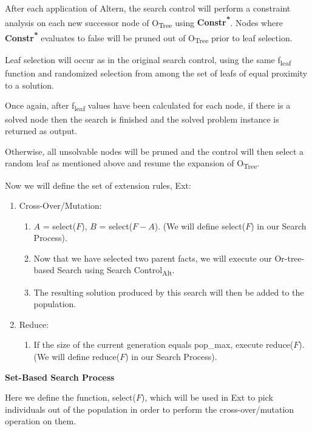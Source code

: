 \documentclass[11pt, oneside]{article}   	%
\newenvironment{cmr}{\fontfamily{cmr}\selectfont}{\par}
\begin{document}
\noindent After each application of Altern, the search control will perform a constraint analysis on each new successor node of O\textsubscript{Tree} using \textbf{Constr\textsuperscript{*}}.
Nodes where \textbf{Constr\textsuperscript{*}} evaluates to false will be pruned out of O\textsubscript{Tree} prior to leaf selection.

\noindent Leaf selection will occur as in the original search control, using the same f\textsubscript{leaf} function and randomized selection from among the set of leafs of equal proximity to a solution.

\begin{cmr}
\noindent Once again, after f\textsubscript{leaf} values have been calculated for each node, if there is a solved node then the search is finished and the solved problem instance is returned as output.

\noindent Otherwise, all unsolvable nodes will be pruned and the control will then select a random leaf as mentioned above and resume the expansion of O\textsubscript{Tree}.
\end{cmr}

\noindent Now we will define the set of extension rules, Ext:
\begin{enumerate} [topsep=0pt, itemsep=0pt, leftmargin=*]
\item Cross-Over/Mutation:
	\begin{enumerate}[leftmargin=*]
	\item $A$ = select($F$), $B$ = select($F - A$). (We will define select($F$) in our Search Process).
	\item Now that we have selected two parent facts, we will execute our Or-tree-based Search using Search Control\textsubscript{Alt}.
	\item The resulting solution produced by this search will then be added to the population.
	\end{enumerate} 
\item Reduce:
	\begin{enumerate}
	\item If the size of the current generation equals pop_max, execute reduce($F$). (We will define reduce($F$) in our Search Process).
	\end{enumerate}
\end{enumerate}

\noindent \textbf{Set-Based Search Process}

\noindent Here we define the function, select($F$), which will be used in Ext to pick individuals out of the population in order to perform the cross-over/mutation operation on them.
\end{document}
